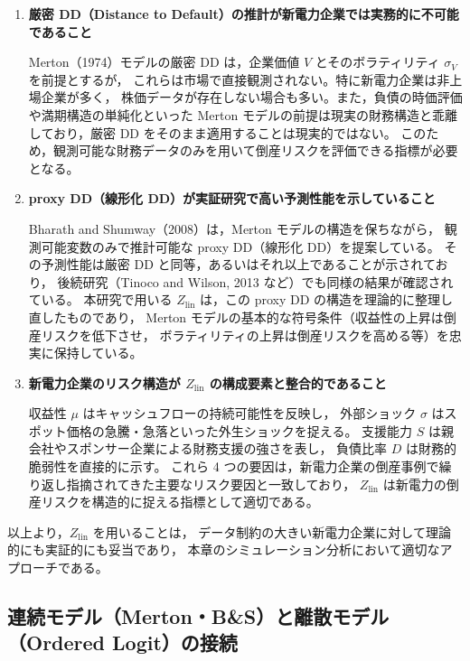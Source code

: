 \begin{enumerate}
    \item \textbf{厳密 DD（Distance to Default）の推計が新電力企業では実務的に不可能であること}

    Merton（1974）モデルの厳密 DD は，企業価値 $V$ とそのボラティリティ $\sigma_V$ を前提とするが，
    これらは市場で直接観測されない。特に新電力企業は非上場企業が多く，
    株価データが存在しない場合も多い。また，負債の時価評価や満期構造の単純化といった
    Merton モデルの前提は現実の財務構造と乖離しており，厳密 DD をそのまま適用することは現実的ではない。
    このため，観測可能な財務データのみを用いて倒産リスクを評価できる指標が必要となる。

    \item \textbf{proxy DD（線形化 DD）が実証研究で高い予測性能を示していること}

    Bharath and Shumway（2008）は，Merton モデルの構造を保ちながら，
    観測可能変数のみで推計可能な proxy DD（線形化 DD）を提案している。
    その予測性能は厳密 DD と同等，あるいはそれ以上であることが示されており，
    後続研究（Tinoco and Wilson, 2013 など）でも同様の結果が確認されている。
    本研究で用いる $Z_{\text{lin}}$ は，この proxy DD の構造を理論的に整理し直したものであり，
    Merton モデルの基本的な符号条件（収益性の上昇は倒産リスクを低下させ，
    ボラティリティの上昇は倒産リスクを高める等）を忠実に保持している。

    \item \textbf{新電力企業のリスク構造が $Z_{\text{lin}}$ の構成要素と整合的であること}

    収益性 $\mu$ はキャッシュフローの持続可能性を反映し，
    外部ショック $\sigma$ はスポット価格の急騰・急落といった外生ショックを捉える。
    支援能力 $S$ は親会社やスポンサー企業による財務支援の強さを表し，
    負債比率 $D$ は財務的脆弱性を直接的に示す。
    これら 4 つの要因は，新電力企業の倒産事例で繰り返し指摘されてきた主要なリスク要因と一致しており，
    $Z_{\text{lin}}$ は新電力の倒産リスクを構造的に捉える指標として適切である。
\end{enumerate}

以上より，$Z_{\text{lin}}$ を用いることは，
データ制約の大きい新電力企業に対して理論的にも実証的にも妥当であり，
本章のシミュレーション分析において適切なアプローチである。

\subsection*{連続モデル（Merton・B\&S）と離散モデル（Ordered Logit）の接続}

